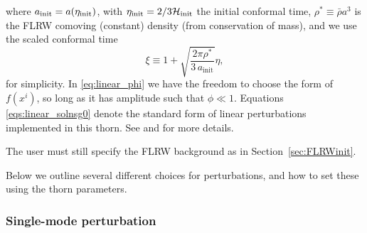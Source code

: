 where $a_{\mathrm{init}} = a(\eta_{\rm init})$, with $\eta_{\rm init}=2/3\mathcal{H}_{\rm init}$ the initial conformal time, $\rho^*\equiv \bar{\rho}a^3$ is the FLRW comoving (constant) density (from conservation of mass), and we use the scaled conformal time
\begin{equation}
	\xi \equiv 1 + \sqrt{\frac{2\pi\rho^{*}}{3\,a_\mathrm{init}}}\eta,
\end{equation}
for simplicity. In \eqref{eq:linear_phi} we have the freedom to choose the form of $f(x^i)$, so long as it has amplitude such that $\phi\ll1$. Equations \eqref{eqs:linear_solnsg0} denote the standard form of linear perturbations implemented in this thorn. See \cite{macpherson2017} and \cite{macpherson2019} for more details. 

The user must still specify the FLRW background as in Section~\ref{sec:FLRWinit}.

Below we outline several different choices for perturbations, and how to set these using the thorn parameters.

\subsubsection{Single-mode perturbation}\label{sec:singlemode_ics}

